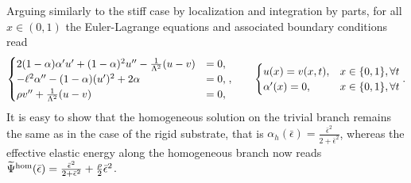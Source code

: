 Arguing similarly to the stiff case by localization and integration by parts, for all $x \in (0, 1)$ the Euler-Lagrange equations and associated boundary conditions read
\begin{eqnarray}
    \label{modeld_el_1}
    \begin{cases}
        2(1-\alpha)\alpha' u' +(1-\alpha)^2 u'' -  \frac{1}{\Lambda^2}(u-v) & = 0, \\
        -\ell^2\alpha'' - (1-\alpha)( u')^2 + 2\alpha                         & = 0, \\
        \rho  v''  +  \frac{1}{\Lambda^2}(u-v)                  & = 0, \\
    \end{cases}
    ,    \qquad
    \begin{cases}
        u(x)       = v(x, t), & x\in\{0, 1\}, \forall t \\
        \alpha'(x) = 0,            & x\in\{0, 1\}, \forall t \\
    \end{cases}
    .
    \label{auto2}
\end{eqnarray}
It is easy to show that the homogeneous solution on the trivial branch remains the same as in the case of the rigid substrate, that is $\alpha_h(\bar{\epsilon}) = \frac{\bar{\epsilon}^2}{2 + \bar{\epsilon}^2}\label{eq:homo11}$, whereas the effective elastic energy along the homogeneous branch now reads $\widetilde\Psi^\text{hom}(\bar{\epsilon}) = \frac{\bar{\epsilon}^2}{2 + \bar{\epsilon}^2} + \frac{\rho}{2}\bar{\epsilon}^2$.

